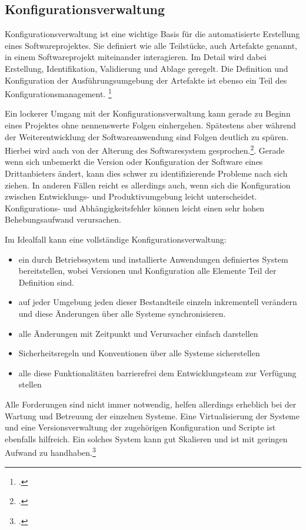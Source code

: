 \subsection{Konfigurationsverwaltung}
\label{subsec:konfigurationsverwaltung}

Konfigurationsverwaltung ist eine wichtige Basis für die automatisierte Erstellung eines Softwareprojektes. Sie definiert 
wie alle Teilstücke, auch Artefakte genannt, in einem Softwareprojekt miteinander interagieren. Im Detail wird dabei 
Erstellung, Identifikation, Validierung und Ablage geregelt. Die Definition und Konfiguration der Ausführungsumgebung der 
Artefakte ist ebenso ein Teil des Konfigurationsmanagement. \footcite{humble2010}

Ein lockerer Umgang mit der Konfigurationsverwaltung kann gerade zu Beginn eines Projektes ohne nennenswerte Folgen 
einhergehen. Spätestens aber während der Weiterentwicklung der Softwareanwendung sind Folgen deutlich zu spüren. Hierbei 
wird auch von der Alterung des Softwaresystem gesprochen.\footcite{software-quality2008}. Gerade wenn sich unbemerkt die 
Version oder Konfiguration der Software eines Drittanbieters ändert, kann dies schwer zu identifizierende Probleme nach 
sich ziehen. In anderen Fällen reicht es allerdings auch, wenn sich die Konfiguration zwischen Entwicklungs- und 
Produktivumgebung leicht unterscheidet. Konfigurations- und Abhängigkeitsfehler können leicht einen sehr hohen 
Behebungsaufwand verursachen.

Im Idealfall kann eine vollständige Konfigurationsverwaltung:
\begin{itemize}
\item ein durch Betriebssystem und installierte Anwendungen definiertes System bereitstellen, wobei Versionen und Konfiguration alle Elemente Teil der Definition sind.
\item auf jeder Umgebung jeden dieser Bestandteile einzeln inkrementell verändern und diese Änderungen über alle Systeme synchronisieren.
\item alle Änderungen mit Zeitpunkt und Verursacher einfach darstellen
\item Sicherheitsregeln und Konventionen über alle Systeme sicherstellen
\item alle diese Funktionalitäten barrierefrei dem Entwicklungsteam zur Verfügung stellen
\end{itemize}

Alle Forderungen sind nicht immer notwendig, helfen allerdings erheblich bei der Wartung und Betreuung der einzelnen Systeme. 
Eine Virtualisierung der Systeme und eine Versionsverwaltung der zugehörigen Konfiguration und Scripte ist ebenfalls 
hilfreich. Ein solches System kann gut Skalieren und ist mit geringen Aufwand zu handhaben.\footcite{humble2010}

